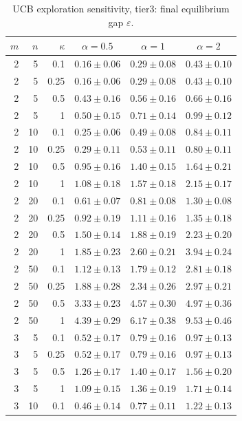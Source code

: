 \begin{table}[htbp]
\centering
\scriptsize
\caption{UCB exploration sensitivity, tier3: final equilibrium gap $\varepsilon$.}
\label{tab:ucb_alpha_tier3_eq_gap_last}
\begin{tabular}{@{}rrrccc@{}}
\toprule
$m$ & $n$ & $\kappa$ & $\alpha=0.5$ & $\alpha=1$ & $\alpha=2$ \\
\midrule
2 & 5 & 0.1 & $0.16 \pm 0.06$ & $0.29 \pm 0.08$ & $0.43 \pm 0.10$ \\
2 & 5 & 0.25 & $0.16 \pm 0.06$ & $0.29 \pm 0.08$ & $0.43 \pm 0.10$ \\
2 & 5 & 0.5 & $0.43 \pm 0.16$ & $0.56 \pm 0.16$ & $0.66 \pm 0.16$ \\
2 & 5 & 1 & $0.50 \pm 0.15$ & $0.71 \pm 0.14$ & $0.99 \pm 0.12$ \\
2 & 10 & 0.1 & $0.25 \pm 0.06$ & $0.49 \pm 0.08$ & $0.84 \pm 0.11$ \\
2 & 10 & 0.25 & $0.29 \pm 0.11$ & $0.53 \pm 0.11$ & $0.80 \pm 0.11$ \\
2 & 10 & 0.5 & $0.95 \pm 0.16$ & $1.40 \pm 0.15$ & $1.64 \pm 0.21$ \\
2 & 10 & 1 & $1.08 \pm 0.18$ & $1.57 \pm 0.18$ & $2.15 \pm 0.17$ \\
2 & 20 & 0.1 & $0.61 \pm 0.07$ & $0.81 \pm 0.08$ & $1.30 \pm 0.08$ \\
2 & 20 & 0.25 & $0.92 \pm 0.19$ & $1.11 \pm 0.16$ & $1.35 \pm 0.18$ \\
2 & 20 & 0.5 & $1.50 \pm 0.14$ & $1.88 \pm 0.19$ & $2.23 \pm 0.20$ \\
2 & 20 & 1 & $1.85 \pm 0.23$ & $2.60 \pm 0.21$ & $3.94 \pm 0.24$ \\
2 & 50 & 0.1 & $1.12 \pm 0.13$ & $1.79 \pm 0.12$ & $2.81 \pm 0.18$ \\
2 & 50 & 0.25 & $1.88 \pm 0.28$ & $2.34 \pm 0.26$ & $2.97 \pm 0.21$ \\
2 & 50 & 0.5 & $3.33 \pm 0.23$ & $4.57 \pm 0.30$ & $4.97 \pm 0.36$ \\
2 & 50 & 1 & $4.39 \pm 0.29$ & $6.17 \pm 0.38$ & $9.53 \pm 0.46$ \\
\midrule
3 & 5 & 0.1 & $0.52 \pm 0.17$ & $0.79 \pm 0.16$ & $0.97 \pm 0.13$ \\
3 & 5 & 0.25 & $0.52 \pm 0.17$ & $0.79 \pm 0.16$ & $0.97 \pm 0.13$ \\
3 & 5 & 0.5 & $1.26 \pm 0.17$ & $1.40 \pm 0.17$ & $1.56 \pm 0.20$ \\
3 & 5 & 1 & $1.09 \pm 0.15$ & $1.36 \pm 0.19$ & $1.71 \pm 0.14$ \\
3 & 10 & 0.1 & $0.46 \pm 0.14$ & $0.77 \pm 0.11$ & $1.22 \pm 0.13$ \\

\end{tabular}
\end{table}
